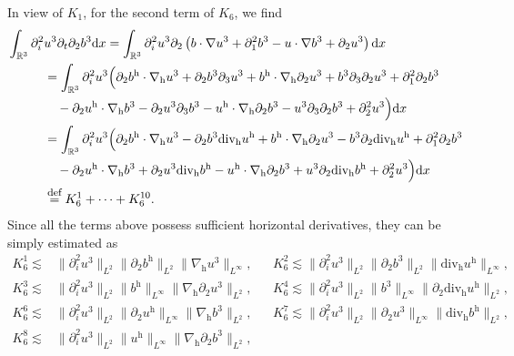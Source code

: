 \documentclass[11pt]{amsart}
\theoremstyle{definition}
\newcommand{\R}{\mathbb{R}}
\newcommand{\h}{\mathrm{h}}
\def\eqdefa{\buildrel\hbox{\footnotesize def}\over =}
\numberwithin{equation}{section}
\begin{document}
In view of $K_1$, for the second term of $K_6$, we find
\begin{align*}
	\int_{\R^3}\partial_{i}^2&u^3\partial_{t}\partial_{2}b^3\mathrm{d}x=\int_{\R^3} \partial_{i}^2u^3\partial_{2}\left(b\cdot\nabla u^3+\partial^{2}_{1}b^3-u\cdot\nabla b^3+\partial_{2}u^3\right)\mathrm{d}x\\&=
	\int_{\R^3} \partial_{i}^2u^3\Big(\partial_{2}b^{\mathrm{h}}\cdot\nabla_{\mathrm{h}} u^3+\partial_{2}b^3\partial_{3}u^3+b^{\mathrm{h}}\cdot\nabla_{\mathrm{h}} \partial_{2}u^3+b^3\partial_{3}\partial_{2}u^3+\partial^{2}_{1}\partial_{2}b^3\\&\quad-\partial_{2}u^\mathrm{h}\cdot\nabla_{\mathrm{h}} b^3-\partial_{2}u^3\partial_{3}b^3-u^\mathrm{h}\cdot\nabla_{\mathrm{h}} \partial_{2}b^3-u^3\partial_{3}\partial_{2}b^3+\partial_{2}^2u^3\Big)\mathrm{d}x\\&=
	\int_{\R^3} \partial_{i}^2u^3\Big(\partial_{2}b^{\mathrm{h}}\cdot\nabla_{\mathrm{h}} u^3-\partial_{2}b^3\mathrm{div_h}u^\h+b^{\mathrm{h}}\cdot\nabla_{\mathrm{h}} \partial_{2}u^3-b^3\partial_{2}\mathrm{div_h}u^\h+\partial^{2}_{1}\partial_{2}b^3\\&\quad-\partial_{2}u^\mathrm{h}\cdot\nabla_{\mathrm{h}} b^3+\partial_{2}u^3\mathrm{div_h}b^\h-u^\mathrm{h}\cdot\nabla_{\mathrm{h}} \partial_{2}b^3+u^3\partial_{2}\mathrm{div_h}b^\h+\partial_{2}^2u^3\Big)\mathrm{d}x
	\\& \eqdefa
	K^{1}_{6}+\cdots+ K^{10}_{6}.
\end{align*}
Since all the terms above possess sufficient horizontal derivatives, they can be simply estimated as
\begin{align*}
	K^{1}_{6}\lesssim& \|\partial_{i}^2u^3\|_{L^2}\|\partial_{2}b^{\mathrm{h}}\|_{L^2}\|\nabla_{\mathrm{h}} u^3\|_{L^\infty},
	&&K^{2}_{6}\lesssim \|\partial_{i}^2u^3\|_{L^2}\|\partial_{2}b^3\|_{L^2}\|\mathrm{div_h}u^\h\|_{L^\infty},\\
	K^{3}_{6}\lesssim& \|\partial_{i}^2u^3\|_{L^2}\|b^{\mathrm{h}}\|_{L^\infty}\|\nabla_{\mathrm{h}}\partial_2 u^3\|_{L^2},
	&&K^{4}_{6}\lesssim \|\partial_{i}^2u^3\|_{L^2}\|b^3\|_{L^\infty}\|\partial_{2}\mathrm{div_h}u^\h \|_{L^2},\\
	K^{6}_{6}\lesssim& \|\partial_{i}^2u^3\|_{L^2}\|\partial_{2}u^{\mathrm{h}}\|_{L^\infty}\|\nabla_{\mathrm{h}} b^3\|_{L^2},
	&&K^{7}_{6}\lesssim \|\partial_{i}^2u^3\|_{L^2}\|\partial_{2}u^3\|_{L^\infty}\|\mathrm{div_h}b^\h\|_{L^2},\\
	K^{8}_{6}\lesssim& \|\partial_{i}^2u^3\|_{L^2}\|u^{\mathrm{h}}\|_{L^\infty}\|\nabla_{\mathrm{h}} \partial_{2}b^3\|_{L^2},
\end{align*}
\end{document}
